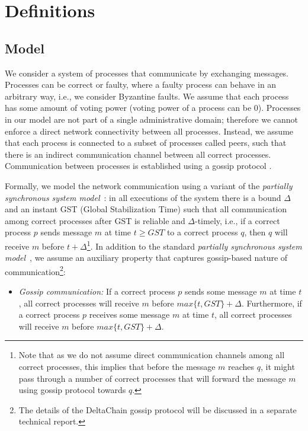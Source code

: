 \section{Definitions} \label{sec:definitions}

\subsection{Model}

We consider a system of processes that communicate by exchanging messages.
Processes can be correct or faulty, where a faulty process can behave in an
arbitrary way, i.e., we consider Byzantine faults. We assume that each process
has some amount of voting power (voting power of a process can be $0$).
Processes in our model are not part of a single administrative domain;
therefore we cannot enforce a direct network connectivity between all
processes. Instead, we assume that each process is connected to a subset of
processes called peers, such that there is an indirect communication channel
between all correct processes. Communication between processes is established
using a gossip protocol \cite{Dem1987:gossip}.

Formally, we model the network communication using a variant of the \emph{partially
synchronous system model}~\cite{DLS88:jacm}: in all executions of the system
there is a bound $\Delta$ and an instant GST (Global Stabilization Time) such
that all communication among correct processes after GST is reliable and
$\Delta$-timely, i.e., if a correct process $p$ sends message $m$ at time $t
\ge GST$ to a correct process $q$, then $q$ will receive $m$ before $t +
\Delta$\footnote{Note that as we do not assume direct communication channels
    among all correct processes, this implies that before the message $m$
    reaches $q$, it might pass through a number of correct processes that will
forward the message $m$ using gossip protocol towards $q$.}. 
In addition to the standard \emph{partially
	synchronous system model}~\cite{DLS88:jacm}, we assume an auxiliary property 
that captures gossip-based nature of communication\footnote{The details of the DeltaChain gossip protocol will be discussed in a separate
	technical report. }:


\begin{itemize} \item \emph{Gossip communication:} If a correct process $p$
	sends some message $m$ at time $t$, all correct processes will receive
	$m$ before $max\{t, GST\} + \Delta$. Furthermore, if a correct process $p$
	receives some message $m$ at time $t$, all correct processes will receive
	$m$ before $max\{t, GST\} + \Delta$.    \end{itemize}


